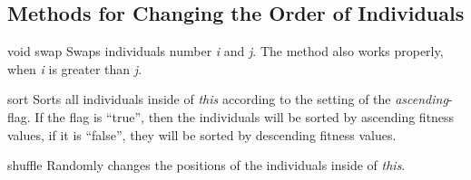 \subsection{Methods for Changing the Order of Individuals}

\setNormalInstance
\setCorrectWidthThree{8pt}
\printMethodWithParamsSaved
{void}
{}
{swap}
{Swaps individuals number {\em i} and {\em j}. The method also works
 properly, when {\em i} is greater than {\em j}.}
{}
\setCorrectWidthThree{4pt}

\vspace*{4ex}

\setNormalInstance
\printEmptyMethod
{sort}
{Sorts all individuals inside of {\em this} according to the setting of the
 {\em ascending}-flag. If the flag is ``true'', then the individuals
 will be sorted by ascending fitness values, if it is ``false'',
 they will be sorted by descending fitness values.}

\clearpage

\setNormalInstance
\printEmptyMethod
{shuffle}
{Randomly changes the positions of the individuals inside of {\em this}.}
